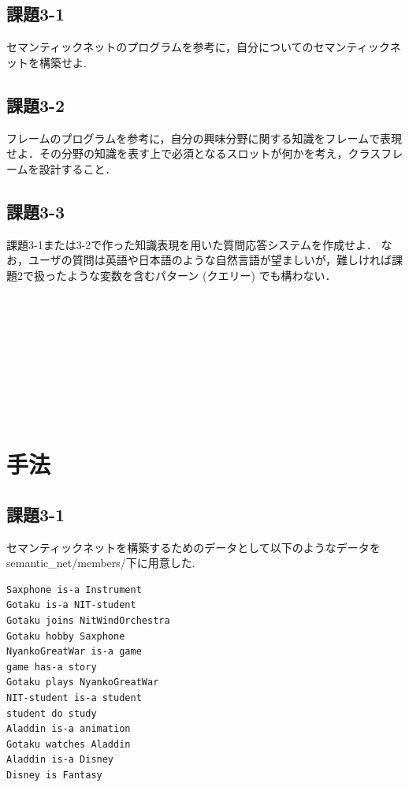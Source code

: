 \documentclass[uplatex,12pt]{jsarticle}
\begin{document}
\subsection{課題3-1}
\begin{screen}
セマンティックネットのプログラムを参考に，自分についてのセマンティックネットを構築せよ.
\end{screen}
\subsection{課題3-2}
\begin{screen}
フレームのプログラムを参考に，自分の興味分野に関する知識をフレームで表現せよ．その分野の知識を表す上で必須となるスロットが何かを考え，クラスフレームを設計すること．
\end{screen}
\subsection{課題3-3}
\begin{screen}
課題3-1または3-2で作った知識表現を用いた質問応答システムを作成せよ．
なお，ユーザの質問は英語や日本語のような自然言語が望ましいが，難しければ課題2で扱ったような変数を含むパターン (クエリー) でも構わない．
\end{screen}
\\\\\\\\\\\\\\\\
\section{手法}
\subsection{課題3-1}
セマンティックネットを構築するためのデータとして以下のようなデータをsemantic\_net/members/下に用意した.
\begin{lstlisting}[caption=semantic\_net/members/goto.txt, label=mid]
Saxphone is-a Instrument
Gotaku is-a NIT-student
Gotaku joins NitWindOrchestra
Gotaku hobby Saxphone
NyankoGreatWar is-a game
game has-a story
Gotaku plays NyankoGreatWar
NIT-student is-a student
student do study
Aladdin is-a animation
Gotaku watches Aladdin
Aladdin is-a Disney
Disney is Fantasy
\end{lstlisting}
\end{document}
